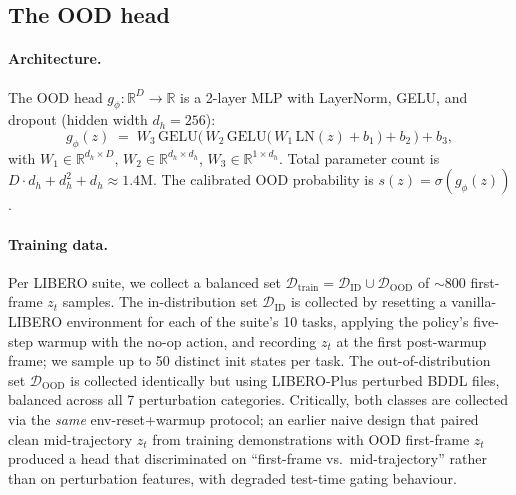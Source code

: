 \documentclass{article}
\begin{document}
\subsection{The OOD head}
\label{sec:method:ood_head}

\paragraph{Architecture.} The OOD head $g_\phi:\mathbb{R}^{D}\to\mathbb{R}$
is a 2-layer MLP with LayerNorm, GELU, and dropout (hidden width
$d_h{=}256$):
\begin{equation}
  g_\phi(z)
  \;=\;
  W_3\,\mathrm{GELU}\!\bigl(\,W_2\,\mathrm{GELU}\!\bigl(\,W_1\,\mathrm{LN}(z) + b_1\,\bigr) + b_2\,\bigr) + b_3,
  \label{eq:ood_head}
\end{equation}
with $W_1\in\mathbb{R}^{d_h\times D}$, $W_2\in\mathbb{R}^{d_h\times d_h}$,
$W_3\in\mathbb{R}^{1\times d_h}$. Total parameter count is
$D\!\cdot\! d_h + d_h^2 + d_h \approx 1.4\text{M}$. The calibrated
OOD probability is $s(z)\!=\!\sigma(g_\phi(z))$.

\paragraph{Training data.} Per LIBERO suite, we collect a balanced set
$\mathcal{D}_{\mathrm{train}} = \mathcal{D}_{\mathrm{ID}}\cup\mathcal{D}_{\mathrm{OOD}}$ of
$\sim 800$ first-frame $z_t$ samples. The in-distribution set
$\mathcal{D}_{\mathrm{ID}}$ is collected by resetting a vanilla-LIBERO
environment for each of the suite's 10 tasks, applying the policy's
five-step warmup with the no-op action, and recording $z_t$ at the
first post-warmup frame; we sample up to 50 distinct init states per
task. The out-of-distribution set $\mathcal{D}_{\mathrm{OOD}}$ is collected
identically but using LIBERO-Plus perturbed BDDL files, balanced
across all 7 perturbation categories. Critically, both classes are
collected via the \emph{same} env-reset+warmup protocol; an earlier
naive design that paired clean mid-trajectory $z_t$ from training
demonstrations with OOD first-frame $z_t$ produced a head that
discriminated on ``first-frame vs.\ mid-trajectory'' rather than on
perturbation features, with degraded test-time gating behaviour.
\end{document}
